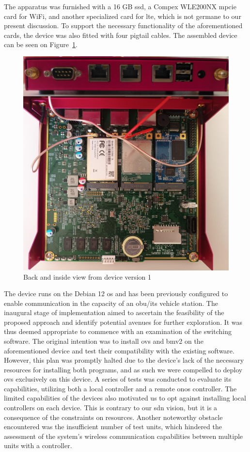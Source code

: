 The apparatus was furnished with a 16 GB \gls{ssd}, a Compex WLE200NX \gls{mpcie} card for WiFi, and another specialized card for \gls{lte}, which is not germane to our present discussion. To support the necessary functionality of the aforementioned cards, the device was also fitted with four pigtail cables. The assembled device can be seen on Figure~\ref{fig:device_1}.

\begin{figure}
	\centering
	\includegraphics[width=\textwidth]{Chapters/Figures/Implementation/devices/device_1.jpg}
	\caption{Back and inside view from device version 1}
	\label{fig:device_1}
\end{figure}

The device runs on the Debian 12 \gls{os} and has been previously configured to enable communication in the capacity of an \gls{obu}/\gls{its} vehicle station.
The inaugural stage of implementation aimed to ascertain the feasibility of the proposed approach and identify potential avenues for further exploration. It was thus deemed appropriate to commence with an examination of the switching software. The original intention was to install \gls{ovs} and \gls{bmv2} on the aforementioned device and test their compatibility with the existing software. However, this plan was promptly halted due to the device's lack of the necessary resources for installing both programs, and as such we were compelled to deploy \gls{ovs} exclusively on this device. 
A series of tests was conducted to evaluate its capabilities, utilizing both a local controller and a remote \gls{onos} controller. The limited capabilities of the devices also motivated us to opt against installing local controllers on each device. This is contrary to our \gls{sdn} vision, but it is a consequence of the constraints on resources. Another noteworthy obstacle encountered was the insufficient number of test units, which hindered the assessment of the system's wireless communication capabilities between multiple units with a controller.

